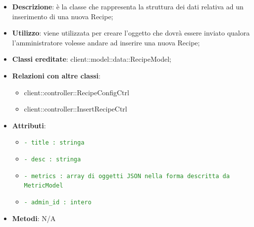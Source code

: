 			\begin{itemize}
				\item \textbf{Descrizione}: è la classe che rappresenta la struttura dei dati relativa ad un inserimento di una nuova Recipe;
				\item \textbf{Utilizzo}: viene utilizzata per creare l'oggetto che dovrà essere inviato qualora l'amministratore volesse andare ad inserire una nuova Recipe;
				\item \textbf{Classi ereditate}: client::model::data::RecipeModel;
				\item \textbf{Relazioni con altre classi}:
					\begin{itemize}
						\item client::controller::RecipeConfigCtrl
						\item client::controller::InsertRecipeCtrl
					\end{itemize}
				\item \textbf{Attributi}:
					\begin{itemize}
						\item \textcolor{forestgreen}{\texttt{- title : stringa}}
						\item \textcolor{forestgreen}{\texttt{- desc : stringa}}
						\item \textcolor{forestgreen}{\texttt{- metrics : array di oggetti JSON nella forma descritta da MetricModel}}
						\item \textcolor{forestgreen}{\texttt{- admin\_id : intero}}
					\end{itemize}
				\item \textbf{Metodi}: N/A
			\end{itemize}

